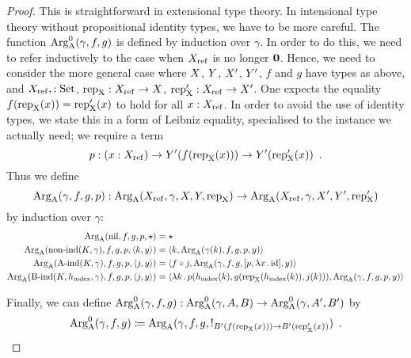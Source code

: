 \documentclass{article}
\begin{document}
\begin{proof}
  This is straightforward in extensional type theory. In intensional
  type theory without propositional identity types, we have to be more
  careful. The function $\text{Arg}^{0}_{\mathrm{A}}(\gamma, f, g)$ is defined by induction
  over $\gamma$. In order to do this, we need to refer inductively to
  the case when $X_{\mathrm{ref}}$ is no longer $\mathbf{0}$. Hence, we need to
  consider the more general case where $X$, $Y$, $X'$, $Y'$, $f$
  and $g$ have types as above, and $X_{\mathrm{ref}}, : \text{Set}$, $\text{rep}_{\mathrm{X}} : X_{\mathrm{ref}} \to
  X$, $\text{rep}_{\mathrm{X}}' : X_{\mathrm{ref}} \to X'$. One expects the equality $f(\text{rep}_{\mathrm{X}}(x))
  = \text{rep}_{\mathrm{X}}'(x)$ to hold for all $x : X_{\mathrm{ref}}$. In order to avoid the use
  of identity types, we state this in a form of Leibniz equality,
  specialised to the instance we actually need;  we require a term
  \[
  p : (x : X_{\mathrm{ref}}) \to Y'(f(\text{rep}_{\mathrm{X}}(x))) \to Y'(\text{rep}_{\mathrm{X}}'(x)) \enspace .
  \]
  Thus we define
  \[
  \ArgA(\gamma, f, g, p) : %
  \ArgA(\Xref, \gamma, \A, \B, \repA)
  \to \ArgA(\Xref, \gamma, \A', \B', \repA')
  \]
  by induction over $\gamma$:
  \begin{align*}
    \text{Arg}_{\mathrm{A}}(\text{nil}, f, g, p, \star) &= \star\\
    \text{Arg}_{\mathrm{A}}(\text{non-ind}(K, \gamma), f, g, p, \langle k , y\rangle) &= \langle k , \text{Arg}_{\mathrm{A}}(\gamma(k), f, g, p, y)\rangle\\
    \text{Arg}_{\mathrm{A}}(\text{A-ind}(K, \gamma), f, g, p, \langle j , y\rangle) &= \langle f \circ j , \text{Arg}_{\mathrm{A}}(\gamma, f, g, [p, \lambda x\,.\,\text{id}], y)\rangle\\
    \text{Arg}_{\mathrm{A}}(\text{B-ind}(K, h_{\mathrm{index}}, \gamma), f, g, p, \langle j , y\rangle) &= \langle \lambda k\,.\,p(h_{\mathrm{index}}(k), g(\text{rep}_{\mathrm{X}}(h_{\mathrm{index}}(k)), j(k))) , \text{Arg}_{\mathrm{A}}(\gamma, f, g, p, y)\rangle
  \end{align*}
  
  Finally, we can define $\text{Arg}^{0}_{\mathrm{A}}(\gamma, f, g) : \text{Arg}^{0}_{\mathrm{A}}(\gamma, A, B) \to
  \text{Arg}^{0}_{\mathrm{A}}(\gamma, A', B')$ by
  \[
  \text{Arg}^{0}_{\mathrm{A}}(\gamma, f, g) \coloneqq \text{Arg}_{\mathrm{A}}(\gamma,f, g, !_{B'(f(\text{rep}_{\mathrm{X}}(x))) \to B'(\text{rep}_{\mathrm{X}}'(x))}) \enspace .
  \]
\end{proof}
\end{document}
